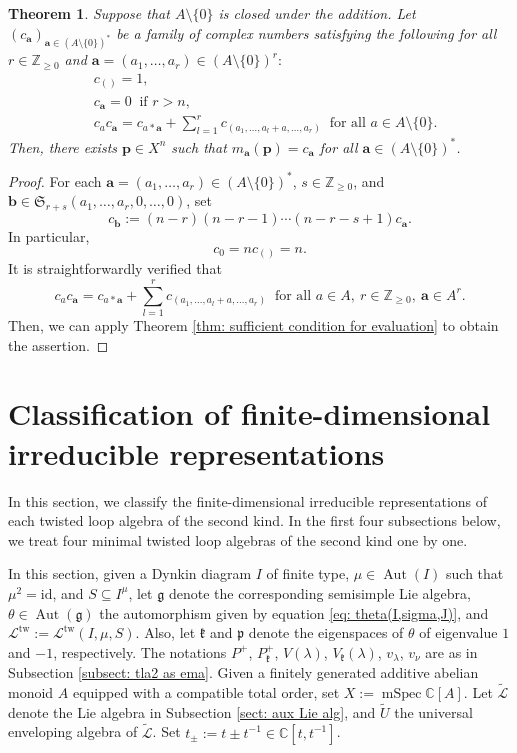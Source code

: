 \documentclass[12pt,a4paper]{amsart}
\newtheorem{thm}{Theorem}[subsection]
\theoremstyle{definition}
\numberwithin{equation}{subsection}
\begin{document}
\begin{thm}\label{thm: sufficient condition for evaluation2}
  Suppose that $A \setminus \{0\}$ is closed under the addition.
  Let $(c_\mathbf{a})_{\mathbf{a} \in (A \setminus \{0\})^*}$ be a family of complex numbers satisfying the following for all $r \in \mathbb{Z}_{\geq 0}$ and $\mathbf{a} = (a_1,\dots,a_r) \in (A \setminus \{0\})^r$$:$
  \begin{align*}
    &c_{()} = 1,\\
    &c_\mathbf{a} = 0 \ \text{ if } r > n,\\
    &c_a c_\mathbf{a} = c_{a*\mathbf{a}} + \sum_{l=1}^r c_{(a_1,\dots,a_l+a,\dots,a_r)} \ \text{ for all } a \in A \setminus \{0\}.
  \end{align*}
  Then, there exists $\mathbf{p} \in X^n$ such that $m_\mathbf{a}(\mathbf{p}) = c_\mathbf{a}$ for all $\mathbf{a} \in (A \setminus \{0\})^*$.
\end{thm}
\begin{proof}
  For each $\mathbf{a} = (a_1,\dots,a_r) \in (A \setminus \{0\})^*$, $s \in \mathbb{Z}_{\geq 0}$, and $\mathbf{b} \in \mathfrak{S}_{r+s} (a_1,\dots,a_r,0,\dots,0)$, set
  \[
    c_{\mathbf{b}} := (n-r)(n-r-1) \cdots (n-r-s+1) c_\mathbf{a}.
  \]
  In particular,
  \[
    c_0 = n c_{()} = n.
  \]
  It is straightforwardly verified that
  \[
    c_a c_\mathbf{a} = c_{a*\mathbf{a}} + \sum_{l=1}^r c_{(a_1,\dots,a_l+a,\dots,a_r)} \ \text{ for all } a \in A,\ r \in \mathbb{Z}_{\geq 0},\ \mathbf{a} \in A^r.
  \]
  Then, we can apply Theorem \ref{thm: sufficient condition for evaluation} to obtain the assertion.
\end{proof}


\section{Classification of finite-dimensional irreducible representations}\label{sect: classification}
In this section, we classify the finite-dimensional irreducible representations of each twisted loop algebra of the second kind.
In the first four subsections below, we treat four minimal twisted loop algebras of the second kind one by one.

In this section, given a Dynkin diagram $I$ of finite type, $\mu \in \operatorname{Aut}(I)$ such that $\mu^2 = \mathrm{id}$, and $S \subseteq I^\mu$, let $\mathfrak{g}$ denote the corresponding semisimple Lie algebra, $\theta \in \operatorname{Aut}(\mathfrak{g})$ the automorphism given by equation \eqref{eq: theta(I,sigma,J)}, and $\mathcal{L}^{\mathrm{tw}} := \mathcal{L}^{\mathrm{tw}}(I,\mu,S)$.
Also, let $\mathfrak{k}$ and $\mathfrak{p}$ denote the eigenspaces of $\theta$ of eigenvalue $1$ and $-1$, respectively.
The notations $P^+$, $P_\mathfrak{k}^+$, $V(\lambda)$, $V_\mathfrak{k}(\lambda)$, $v_\lambda$, $v_\nu$ are as in Subsection \ref{subsect: tla2 as ema}.
Given a finitely generated additive abelian monoid $A$ equipped with a compatible total order, set $X := \operatorname{mSpec} \mathbb{C}[A]$.
Let $\tilde{\mathcal{L}}$ denote the Lie algebra in Subsection \ref{sect: aux Lie alg}, and $\tilde{U}$ the universal enveloping algebra of $\tilde{\mathcal{L}}$.
Set $t_\pm := t \pm t^{-1} \in \mathbb{C}[t,t^{-1}]$.
\end{document}
